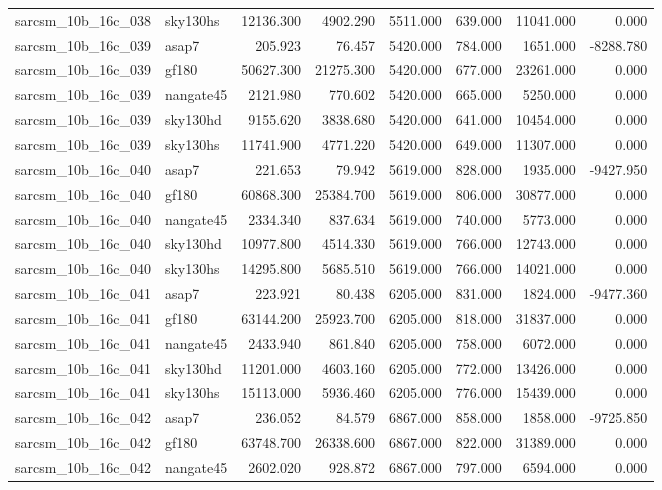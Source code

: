 \begin{tabular}{llrrrrrr}
sarcsm\_10b\_16c\_038 & sky130hs & 12136.300 & 4902.290 & 5511.000 & 639.000 & 11041.000 & 0.000 \\
sarcsm\_10b\_16c\_039 & asap7 & 205.923 & 76.457 & 5420.000 & 784.000 & 1651.000 & -8288.780 \\
sarcsm\_10b\_16c\_039 & gf180 & 50627.300 & 21275.300 & 5420.000 & 677.000 & 23261.000 & 0.000 \\
sarcsm\_10b\_16c\_039 & nangate45 & 2121.980 & 770.602 & 5420.000 & 665.000 & 5250.000 & 0.000 \\
sarcsm\_10b\_16c\_039 & sky130hd & 9155.620 & 3838.680 & 5420.000 & 641.000 & 10454.000 & 0.000 \\
sarcsm\_10b\_16c\_039 & sky130hs & 11741.900 & 4771.220 & 5420.000 & 649.000 & 11307.000 & 0.000 \\
sarcsm\_10b\_16c\_040 & asap7 & 221.653 & 79.942 & 5619.000 & 828.000 & 1935.000 & -9427.950 \\
sarcsm\_10b\_16c\_040 & gf180 & 60868.300 & 25384.700 & 5619.000 & 806.000 & 30877.000 & 0.000 \\
sarcsm\_10b\_16c\_040 & nangate45 & 2334.340 & 837.634 & 5619.000 & 740.000 & 5773.000 & 0.000 \\
sarcsm\_10b\_16c\_040 & sky130hd & 10977.800 & 4514.330 & 5619.000 & 766.000 & 12743.000 & 0.000 \\
sarcsm\_10b\_16c\_040 & sky130hs & 14295.800 & 5685.510 & 5619.000 & 766.000 & 14021.000 & 0.000 \\
sarcsm\_10b\_16c\_041 & asap7 & 223.921 & 80.438 & 6205.000 & 831.000 & 1824.000 & -9477.360 \\
sarcsm\_10b\_16c\_041 & gf180 & 63144.200 & 25923.700 & 6205.000 & 818.000 & 31837.000 & 0.000 \\
sarcsm\_10b\_16c\_041 & nangate45 & 2433.940 & 861.840 & 6205.000 & 758.000 & 6072.000 & 0.000 \\
sarcsm\_10b\_16c\_041 & sky130hd & 11201.000 & 4603.160 & 6205.000 & 772.000 & 13426.000 & 0.000 \\
sarcsm\_10b\_16c\_041 & sky130hs & 15113.000 & 5936.460 & 6205.000 & 776.000 & 15439.000 & 0.000 \\
sarcsm\_10b\_16c\_042 & asap7 & 236.052 & 84.579 & 6867.000 & 858.000 & 1858.000 & -9725.850 \\
sarcsm\_10b\_16c\_042 & gf180 & 63748.700 & 26338.600 & 6867.000 & 822.000 & 31389.000 & 0.000 \\
sarcsm\_10b\_16c\_042 & nangate45 & 2602.020 & 928.872 & 6867.000 & 797.000 & 6594.000 & 0.000 \\

\end{tabular}
